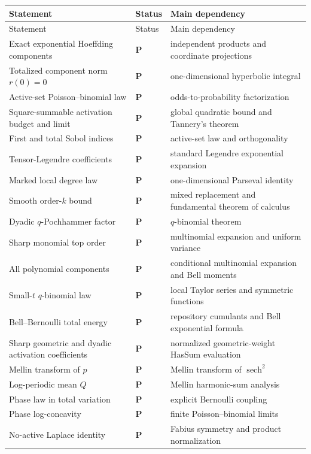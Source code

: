 \documentclass[11pt,oneside]{article}
\theoremstyle{definition}
\theoremstyle{remark}
\newcommand{\sech}{\operatorname{sech}}
\newcommand{\statusP}{\textcolor{deepgreen}{\textbf{P}}}
\begin{document}
\begin{longtable}{@{}p{}p{}p{}@{}}
\toprule
Statement & Status & Main dependency \\
\midrule
\endfirsthead
\toprule
Statement & Status & Main dependency \\
\midrule
\endhead
Exact exponential Hoeffding components & \statusP & independent products and coordinate projections \\
Totalized component norm $r(0)=0$ & \statusP & one-dimensional hyperbolic integral \\
Active-set Poisson--binomial law & \statusP & odds-to-probability factorization \\
Square-summable activation budget and limit & \statusP & global quadratic bound and Tannery's theorem \\
First and total Sobol indices & \statusP & active-set law and orthogonality \\
Tensor-Legendre coefficients & \statusP & standard Legendre exponential expansion \\
Marked local degree law & \statusP & one-dimensional Parseval identity \\
Smooth order-$k$ bound & \statusP & mixed replacement and fundamental theorem of calculus \\
Dyadic $q$-Pochhammer factor & \statusP & $q$-binomial theorem \\
Sharp monomial top order & \statusP & multinomial expansion and uniform variance \\
All polynomial components & \statusP & conditional multinomial expansion and Bell moments \\
Small-$t$ $q$-binomial law & \statusP & local Taylor series and symmetric functions \\
Bell--Bernoulli total energy & \statusP & repository cumulants and Bell exponential formula \\
Sharp geometric and dyadic activation coefficients & \statusP & normalized geometric-weight HasSum evaluation \\
Mellin transform of $p$ & \statusP & Mellin transform of $\sech^2$ \\
Log-periodic mean $Q$ & \statusP & Mellin harmonic-sum analysis \\
Phase law in total variation & \statusP & explicit Bernoulli coupling \\
Phase log-concavity & \statusP & finite Poisson--binomial limits \\
No-active Laplace identity & \statusP & Fabius symmetry and product normalization \\

\end{longtable}
\end{document}
